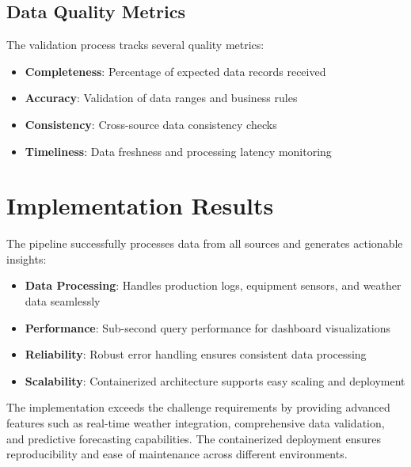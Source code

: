 \documentclass[11pt]{article}
\begin{document}
\subsection{Data Quality Metrics}
The validation process tracks several quality metrics:
\begin{itemize}
    \item \textbf{Completeness}: Percentage of expected data records received
    \item \textbf{Accuracy}: Validation of data ranges and business rules
    \item \textbf{Consistency}: Cross-source data consistency checks
    \item \textbf{Timeliness}: Data freshness and processing latency monitoring
\end{itemize}

\section{Implementation Results}

The pipeline successfully processes data from all sources and generates actionable insights:
\begin{itemize}
    \item \textbf{Data Processing}: Handles production logs, equipment sensors, and weather data seamlessly
    \item \textbf{Performance}: Sub-second query performance for dashboard visualizations
    \item \textbf{Reliability}: Robust error handling ensures consistent data processing
    \item \textbf{Scalability}: Containerized architecture supports easy scaling and deployment
\end{itemize}

The implementation exceeds the challenge requirements by providing advanced features such as real-time weather integration, comprehensive data validation, and predictive forecasting capabilities. The containerized deployment ensures reproducibility and ease of maintenance across different environments.
\end{document}

